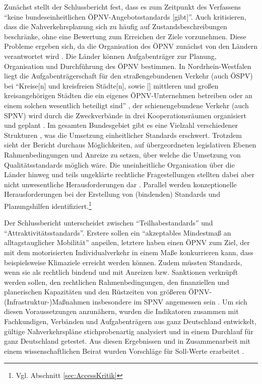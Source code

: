 \documentclass[11pt,pdftex,a4paper]{scrartcl}
\begin{document}
	Zunächst stellt der Schlussbericht fest, dass es zum Zeitpunkt des Verfassens \enquote{keine bundeseinheitlichen ÖPNV-Angebotsstandards [gibt]}. Auch \textcite{kirchhoffOPNVPlanungFurLandliche2010} kritisieren, dass die Nahverkehrsplanung sich zu häufig auf Zustandsbeschreibungen beschränke, ohne eine Bewertung zum Erreichen der Ziele vorzunehmen. Diese Probleme ergeben sich, da die Organisation des ÖPNV zunächst von den Ländern verantwortet wird \parencite[vgl.][§3]{RegGRegionalisierungsgesetz}. Die Länder können Aufgabenträger zur Planung, Organisation und Durchführung des ÖPNV bestimmen. In Nordrhein-Westfalen liegt die Aufgabenträgerschaft für den straßengebundenen Verkehr (auch ÖSPV) bei \enquote{Kreise[n] und kreisfreien Städte[n], sowie [\textellipsis] mittleren und großen kreisangehörigen Städten die ein eigenes ÖPNV-Unternehmen betreiben oder an einem solchen wesentlich beteiligt sind} \parencite[§3]{ÖPNVGNRW}, der schienengebundene Verkehr (auch SPNV) wird durch die Zweckverbände in drei Kooperationsräumen organisiert und geplant \parencites[§5 Abs. 1]{ÖPNVGNRW}[Stand August 2026, ab Januar 2027 eine landesweite Anstalt, vgl.][§6 insbes. Abs. 6]{ÖPNVGNRW}. Im gesamten Bundesgebiet gibt es eine Vielzahl verschiedener Strukturen \parencite[vgl.][25, Tabelle 2-1]{kcwgmbhMethodikUndEmpfehlungen2024}, was die Umsetzung einheitlicher Standards erschwert. Trotzdem sieht der Bericht durchaus Möglichkeiten, auf übergeordneten legislativen Ebenen Rahmenbedingungen und Anreize zu setzen, über welche die Umsetzung von Qualitätsstandards möglich wäre. Die uneinheitliche Organisation über die Länder hinweg und teils ungeklärte rechtliche Fragestellungen stellten dabei aber nicht unwesentliche Herausforderungen dar \parencite[Abschnitt 2.2]{kcwgmbhMethodikUndEmpfehlungen2024}. Parallel werden konzeptionelle Herausforderungen bei der Erstellung von (bindenden) Standards und Planungshilfen identifiziert.\footnote{Vgl. Abschnitt \ref{sec:AccessKritik}}
	
	Der Schlussbericht unterscheidet zwischen \enquote{Teilhabestandards} und \enquote{Attraktivitätsstandards}. Erstere sollen ein \enquote{akzeptables Mindestmaß an alltagstauglicher Mobilität} anpeilen, letztere haben einen ÖPNV zum Ziel, der mit dem motorisierten Individualverkehr in einem Maße konkurrieren kann, dass beispielsweise Klimaziele erreicht werden können. Zudem müssten Standards, wenn sie als rechtlich bindend und mit Anreizen bzw. Sanktionen verknüpft werden sollen, den rechtlichen Rahmenbedingungen, den finanziellen und planerischen Kapazitäten und den Rüstzeiten von größeren ÖPNV-(Infrastruktur-)Maßnahmen insbesondere im SPNV angemessen sein \parencite[vgl.][Abschnitt 4.2]{kcwgmbhMethodikUndEmpfehlungen2024}. Um sich diesen Voraussetzungen anzunähern, wurden die Indikatoren zusammen mit Fachkundigen, Verbänden und Aufgabenträgern aus ganz Deutschland entwickelt, gültige Nahverkehrspläne stichprobenartig analysiert und in einem Durchlauf für ganz Deutschland getestet. Aus diesen Ergebnissen und in Zusammenarbeit mit einem wissenschaftlichen Beirat wurden Vorschläge für Soll-Werte erarbeitet \parencite[Kapitel 5]{kcwgmbhMethodikUndEmpfehlungen2024}.
	
\end{document}
